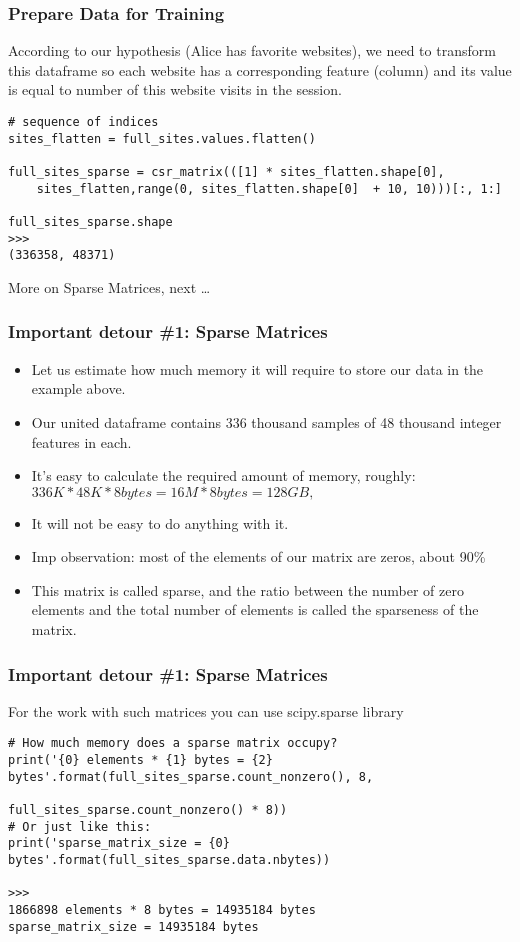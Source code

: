 \begin{frame}[fragile]\frametitle{Prepare Data for Training}	
According to our hypothesis (Alice has favorite websites), we need to transform this dataframe so each website has a corresponding feature (column) and its value is equal to number of this website visits in the session.
\begin{lstlisting}
# sequence of indices
sites_flatten = full_sites.values.flatten()

full_sites_sparse = csr_matrix(([1] * sites_flatten.shape[0],
    sites_flatten,range(0, sites_flatten.shape[0]  + 10, 10)))[:, 1:]

full_sites_sparse.shape
>>>
(336358, 48371)
\end{lstlisting}
More on Sparse Matrices, next \ldots
\end{frame}

\begin{frame}[fragile]\frametitle{Important detour \#1: Sparse Matrices}	
\begin{itemize}
\item Let us estimate how much memory it will require to store our data in the example above. 
\item Our united dataframe contains 336 thousand samples of 48 thousand integer features in each. 
\item It's easy to calculate the required amount of memory, roughly:
$336K * 48K * 8 bytes = 16M * 8 bytes = 128 GB,$

\item It will not be easy to do anything with it.
\item Imp observation: most of the elements of our matrix are zeros, about 90\%
\item This matrix is called sparse, and the ratio between the number of zero elements and the total number of elements is called the sparseness of the matrix.
\end{itemize}

\end{frame}

\begin{frame}[fragile]\frametitle{Important detour \#1: Sparse Matrices}	
For the work with such matrices you can use scipy.sparse library
\begin{lstlisting}
# How much memory does a sparse matrix occupy?
print('{0} elements * {1} bytes = {2} bytes'.format(full_sites_sparse.count_nonzero(), 8, 
                                                    full_sites_sparse.count_nonzero() * 8))
# Or just like this:
print('sparse_matrix_size = {0} bytes'.format(full_sites_sparse.data.nbytes))

>>>
1866898 elements * 8 bytes = 14935184 bytes
sparse_matrix_size = 14935184 bytes
\end{lstlisting}

\end{frame}

